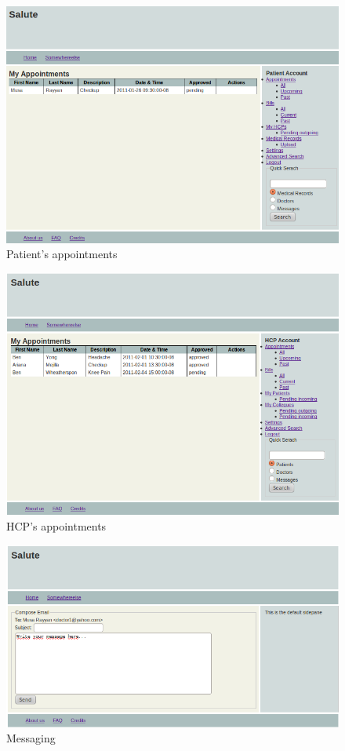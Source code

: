 \begin{figure}
\includegraphics[scale=0.6]{screenshots/Patient_appts.png}
\caption{Patient's appointments}
\end{figure}

\begin{figure}
\includegraphics[scale=0.6]{screenshots/doc_appointments.png}
\caption{HCP's appointments}
\end{figure}
\clearpage
\begin{figure}
\includegraphics[scale=0.6]{screenshots/Messaging.png}
\caption{Messaging}
\end{figure}

